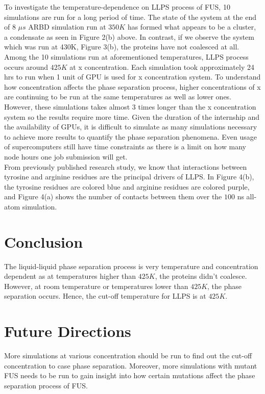 \documentclass[12ptr]{article}
\begin{document}
To investigate the temperature-dependence on LLPS process of FUS, 10 simulations are run for a long period of time. The state of the system at the end of 8 $\mu s$ ARBD simulation run at $350K$ has formed what appears to be a cluster, a condensate as seen in Figure 2(b) above. In contrast, if we observe the system which was run at 430K, Figure 3(b), the proteins have not coalesced at all. Among the 10 simulations run at aforementioned temperatures, LLPS process occurs around $425K$ at x concentration. Each simulation took approximately 24 hrs to run when 1 unit of GPU is used for x concentration system. To understand how concentration affects the phase separation process, higher concentrations of x are continuing to be run at the same temperatures as well as lower ones. However, these simulations takes almost 3 times longer than the x concentration system so the results require more time. Given the duration of the internship and the availability of GPUs, it is difficult to simulate as many simulations necessary to achieve more results to quantify the phase separation phenomena. Even usage of supercomputers still have time constraints as there is a limit on how many node hours one job submission will get. \\[0.01cm] 

From previously published research study, we know that interactions between tyrosine and arginine residues are the principal drivers of LLPS. In Figure 4(b), the tyrosine residues are colored blue and arginine residues are colored purple, and Figure 4(a) shows the number of contacts between them over the $100$ ns all-atom simulation. 
  
\section{Conclusion}
The liquid-liquid phase separation process is very temperature and concentration dependent as at temperatures higher than $425K$, the proteins didn't coalesce. However, at room temperature or temperatures lower than $425K$, the phase separation occurs. Hence, the cut-off temperature for LLPS is at $425K$. 

\section{Future Directions}
More simulations at various concentration should be run to find out the cut-off concentration to case phase separation. Moreover, more simulations with mutant FUS needs to be run to gain insight into how certain mutations affect the phase separation process of FUS.
\newpage
\end{document}
